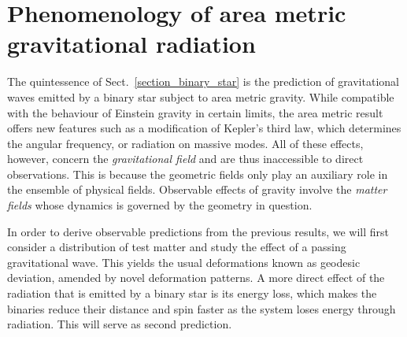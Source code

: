 \section{Phenomenology of area metric gravitational radiation}
The quintessence of Sect.~\ref{section_binary_star} is the prediction of gravitational waves emitted by a binary star subject to area metric gravity. While compatible with the behaviour of Einstein gravity in certain limits, the area metric result offers new features such as a modification of Kepler's third law, which determines the angular frequency, or radiation on massive modes. All of these effects, however, concern the \emph{gravitational field} and are thus inaccessible to direct observations. This is because the geometric fields only play an auxiliary role in the ensemble of physical fields. Observable effects of gravity involve the \emph{matter fields} whose dynamics is governed by the geometry in question.

In order to derive observable predictions from the previous results, we will first consider a distribution of test matter and study the effect of a passing gravitational wave. This yields the usual deformations known as geodesic deviation, amended by novel deformation patterns. A more direct effect of the radiation that is emitted by a binary star is its energy loss, which makes the binaries reduce their distance and spin faster as the system loses energy through radiation. This will serve as second prediction.

